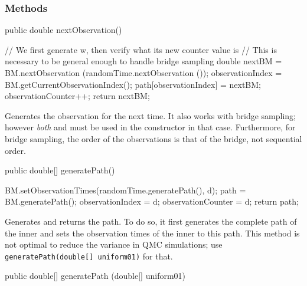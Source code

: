 \subsubsection* {Methods}
\begin{code}

   public double nextObservation()\begin{hide} {
        // We first generate w, then verify what its new counter value is
        // This is necessary to be general enough to handle bridge sampling
        double nextBM = BM.nextObservation (randomTime.nextObservation ()); 
        observationIndex = BM.getCurrentObservationIndex();
        path[observationIndex] = nextBM;
        observationCounter++;
        return nextBM;
    }\end{hide}
\end{code}
\begin{tabb} Generates the observation for the next time.
It also works with bridge sampling; however \emph{both}
 and 
must be used in the constructor in that case.  Furthermore, for bridge
sampling, the order of the observations is that of the bridge,
not sequential order.
\end{tabb}
\begin{code}

   public double[] generatePath() \begin{hide} {
        BM.setObservationTimes(randomTime.generatePath(), d);
        path = BM.generatePath();
        observationIndex = d;
        observationCounter = d;
        return path;
    }\end{hide}
\end{code}
\begin{tabb} Generates and returns the path. To do so, it
first generates the complete path of the inner 
and sets the observation times of the inner 
to this path.  This method is not optimal to reduce the variance in
QMC simulations; use \texttt{generatePath(double[] uniform01)} for that.
\end{tabb}
\begin{code}

   public double[] generatePath (double[] uniform01) 
\end{code}
